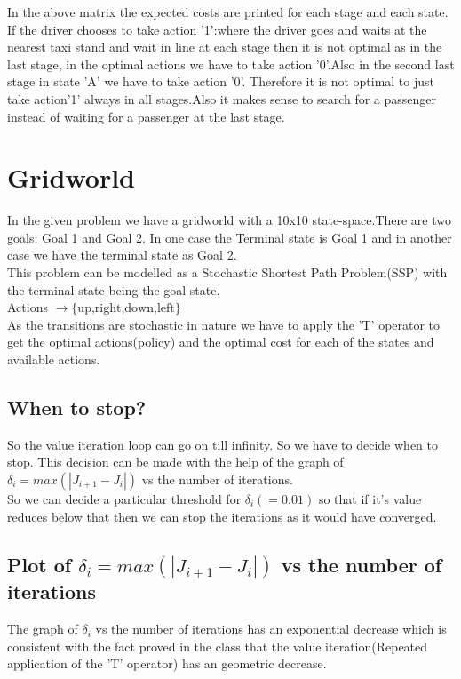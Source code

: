 \documentclass{article}
\begin{document}
In the above matrix the expected costs are printed for each stage and each state.\\

If the driver chooses to take action '1':where the driver goes and waits at the nearest taxi stand and wait in line at each stage then it is not optimal as in the last stage, in the optimal actions we have to take action '0'.Also in the second last stage in state 'A' we have to take action '0'. Therefore it is not optimal to just take action'1' always in all stages.Also it makes sense to search for a passenger instead of waiting for a passenger at the last stage.\\

\section{Gridworld}
In the given problem we have a gridworld with a 10x10 state-space.There are two goals: Goal 1 and Goal 2. In one case the Terminal state is Goal 1 and in another case we have the terminal state as Goal 2.\\
This problem can be modelled as a Stochastic Shortest Path Problem(SSP) with the terminal state being the goal state.\\
Actions $\rightarrow \{\textrm{up,right,down,left}\}$\\
As the transitions are stochastic in nature we have to apply the 'T' operator to get the optimal actions(policy) and the optimal cost for each of the states and available actions.\\


\subsection{When to stop?}
So the value iteration loop can go on till infinity. So we have to decide when to stop. This decision can be made with the help of the graph of $\delta_i=max(|J_{i+1}-J_{i}|)$ vs the number of iterations.\\
 So we can decide a particular threshold for $\delta_i (=0.01)$ so that if it's value reduces below that then we can stop the iterations as it would have converged.
 

\subsection{Plot of $\delta_i=max(|J_{i+1}-J_{i}|)$ vs the number of iterations}
The graph of $\delta_i$ vs the number of iterations has an exponential decrease which is consistent with the fact proved in the class that the value iteration(Repeated application of the 'T' operator) has an geometric decrease. 
\end{document}
